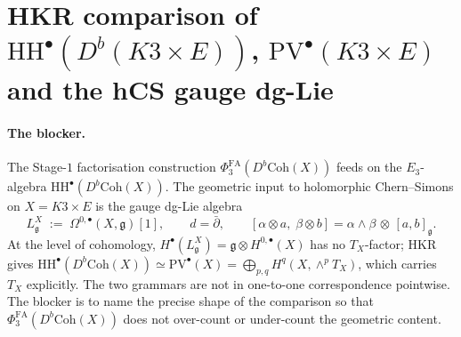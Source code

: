 
\providecommand{\HH}{\mathrm{HH}}
\providecommand{\PV}{\mathrm{PV}}
\providecommand{\hCS}{\mathrm{hCS}}
\providecommand{\Obs}{\mathrm{Obs}}
\providecommand{\Coh}{\mathrm{Coh}}
\providecommand{\Perf}{\mathrm{Perf}}
\providecommand{\BCOV}{\mathrm{BCOV}}
\providecommand{\HKR}{\mathrm{HKR}}
\providecommand{\PhiFA}{\Phi^{\mathrm{FA}}}
\providecommand{\Bun}{\mathrm{Bun}}
\providecommand{\MC}{\mathrm{MC}}
\providecommand{\dbar}{\bar\partial}
\providecommand{\frakg}{\mathfrak{g}}
\providecommand{\Ethree}{E_3}
\providecommand{\Eone}{E_1}
\providecommand{\BV}{\mathrm{BV}}
\providecommand{\C}{\mathbb{C}}
\providecommand{\Z}{\mathbb{Z}}
\providecommand{\sym}{\mathrm{Sym}}
\providecommand{\End}{\mathrm{End}}
\providecommand{\cO}{\mathcal{O}}
\providecommand{\cC}{\mathcal{C}}
\providecommand{\ClaimStatusConditional}[1][]{\textbf{[conditional#1]}}

\section*{HKR comparison of $\HH^\bullet(D^b(K3\times E))$,
 $\PV^\bullet(K3\times E)$ and the hCS gauge dg-Lie}
\label{sec:swarm-blocker6-v2-agent07-hh-pv-comparison}

\paragraph{The blocker.}
The Stage-$1$ factorisation construction $\PhiFA_3(D^b\Coh(X))$ feeds
on the $\Ethree$-algebra $\HH^\bullet(D^b\Coh(X))$. The geometric input
to holomorphic Chern--Simons on $X = K3\times E$ is the gauge dg-Lie
algebra
\[
 L_\frakg^X \;:=\; \Omega^{0,\bullet}(X, \frakg)[1],
 \qquad d = \dbar, \qquad
 [\alpha\otimes a,\;\beta\otimes b] = \alpha\wedge\beta\,\otimes\,[a,b]_\frakg.
\]
At the level of cohomology, $H^\bullet(L_\frakg^X) = \frakg\otimes
H^{0,\bullet}(X)$ has no $T_X$-factor; HKR gives
$\HH^\bullet(D^b\Coh(X)) \simeq \PV^\bullet(X) = \bigoplus_{p,q}
H^q(X,\wedge^p T_X)$, which carries $T_X$ explicitly. The two grammars
are not in one-to-one correspondence pointwise. The blocker is to name
the precise shape of the comparison so that $\PhiFA_3(D^b\Coh(X))$ does
not over-count or under-count the geometric content.

